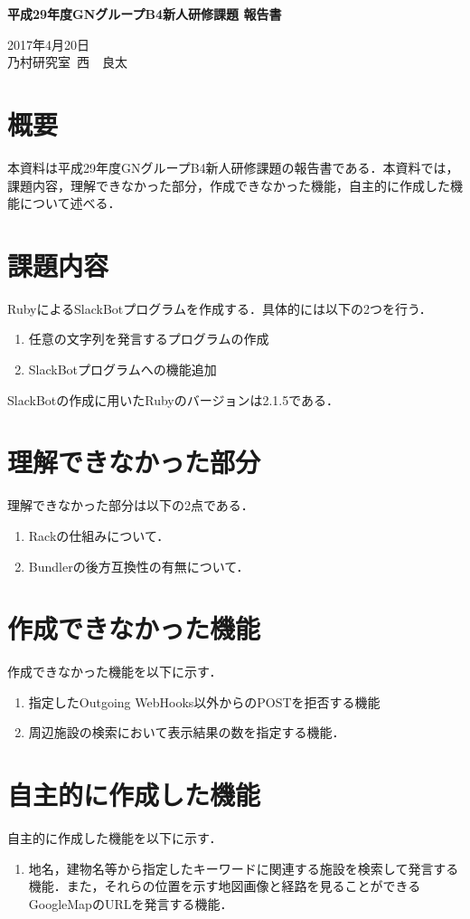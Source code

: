 \documentclass[fleqn, 14pt]{extarticlej}
\begin{document}
\begin{center}
{\Large {\bf 平成29年度GNグループB4新人研修課題 報告書}}

\end{center}

\begin{flushright}
  2017年4月20日\\
  
  乃村研究室\ 西　良太
\end{flushright}

\section{概要}
本資料は平成29年度GNグループB4新人研修課題の報告書である．本資料では，課題内容，理解できなかった部分，作成できなかった機能，自主的に作成した機能について述べる．

\section{課題内容}
RubyによるSlackBotプログラムを作成する．具体的には以下の2つを行う．

\begin{enumerate}
\item 任意の文字列を発言するプログラムの作成
\item SlackBotプログラムへの機能追加
\end{enumerate}

SlackBotの作成に用いたRubyのバージョンは2.1.5である．

\section{理解できなかった部分}
理解できなかった部分は以下の2点である．

\begin{enumerate}
\item Rackの仕組みについて．
\item Bundlerの後方互換性の有無について．
\end{enumerate}

\section{作成できなかった機能}
作成できなかった機能を以下に示す．

\begin{enumerate}
\item 指定したOutgoing WebHooks以外からのPOSTを拒否する機能
\item 周辺施設の検索において表示結果の数を指定する機能．
\end{enumerate}

\section{自主的に作成した機能}
自主的に作成した機能を以下に示す．

\begin{enumerate}
\item 地名，建物名等から指定したキーワードに関連する施設を検索して発言する機能．また，それらの位置を示す地図画像と経路を見ることができるGoogleMapのURLを発言する機能．
\end{enumerate}
\end{document}
